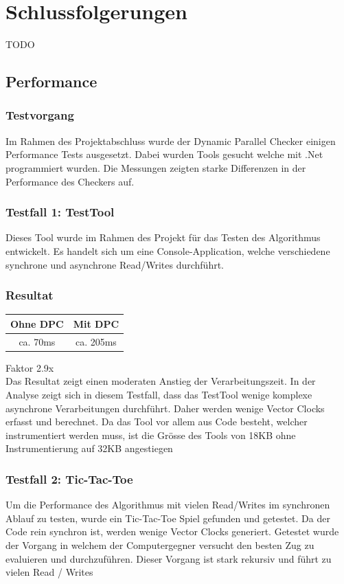 \documentclass[10pt,a4paper]{article}
\begin{document}
\section{Schlussfolgerungen}
TODO\\
\subsection{Performance}
\subsubsection{Testvorgang}
\begin{flushleft}
Im Rahmen des Projektabschluss wurde der Dynamic Parallel Checker einigen Performance Tests ausgesetzt. Dabei wurden Tools gesucht welche mit .Net programmiert wurden. Die Messungen zeigten starke Differenzen in der Performance des Checkers auf.
\subsubsection*{Testfall 1: TestTool}
Dieses Tool wurde im Rahmen des Projekt für das Testen des Algorithmus entwickelt. Es handelt sich um eine Console-Application, welche verschiedene synchrone und asynchrone Read/Writes durchführt.\\
\subsubsection*{Resultat}
\begin{tabular}{|c|c|}
\hline 
Ohne DPC & Mit DPC \\ 
\hline 
ca. 70ms & ca. 205ms \\ 
\hline 
\end{tabular} 
Faktor 2.9x\\[0.4cm]
Das Resultat zeigt einen moderaten Anstieg der Verarbeitungszeit. In der Analyse zeigt sich in diesem Testfall, dass das TestTool wenige komplexe asynchrone Verarbeitungen durchführt. Daher werden wenige Vector Clocks erfasst und berechnet. Da das Tool vor allem aus Code besteht, welcher instrumentiert werden muss, ist die Grösse des Tools von 18KB ohne Instrumentierung auf 32KB angestiegen
\subsubsection*{Testfall 2: Tic-Tac-Toe}
Um die Performance des Algorithmus mit vielen Read/Writes im synchronen Ablauf zu testen, wurde ein Tic-Tac-Toe Spiel gefunden und getestet. Da der Code rein synchron ist, werden wenige Vector Clocks generiert. Getestet wurde der Vorgang in welchem der Computergegner versucht den besten Zug zu evaluieren und durchzuführen. Dieser Vorgang ist stark rekursiv und führt zu vielen Read / Writes\\

\end{flushleft}
\end{document}
